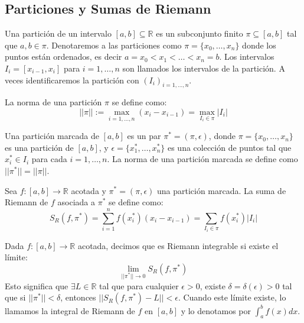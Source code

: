 \documentclass[11pt]{article}
\begin{document}
\subsection{Particiones y Sumas de Riemann}

\begin{definition}
Una partición de un intervalo $[a,b] \subseteq \mathbb{R}$ es un subconjunto finito $\pi \subseteq [a,b]$ tal que $a,b \in \pi$. Denotaremos a las particiones como $\pi = \{x_0, \dots, x_n\}$ donde los puntos están ordenados, es decir $a=x_0 < x_1 < \dots < x_n = b$. Los intervalos $I_i = [x_{i-1}, x_i]$ para $i=1,\dots,n$ son llamados los intervalos de la partición. A veces identificaremos la partición con $(I_i)_{i=1,\dots,n}.$
\end{definition}

\begin{definition}
La norma de una partición $\pi$ se define como:
$$ ||\pi|| := \max_{i=1,\dots,n}(x_i - x_{i-1}) = \max_{I_i \in \pi} |I_i| $$
\end{definition}

\begin{definition}
Una partición marcada de $[a,b]$ es un par $\pi^* = (\pi, \epsilon)$, donde $\pi = \{x_0, \dots, x_n\}$ es una partición de $[a,b]$, y $\epsilon = \{x_1^*, \dots, x_n^*\}$ es una colección de puntos tal que $x_i^* \in I_i$ para cada $i=1,\dots,n$. La norma de una partición marcada se define como $||\pi^*|| = ||\pi||$.
\end{definition}

\begin{definition}
Sea $f:[a,b] \rightarrow \mathbb{R}$ acotada y $\pi^* = (\pi, \epsilon)$ una partición marcada. La suma de Riemann de $f$ asociada a $\pi^*$ se define como:
$$ S_R(f, \pi^*) = \sum_{i=1}^{n} f(x_i^*)(x_i - x_{i-1}) = \sum_{I_i \in \pi} f(x_i^*) |I_i| $$
\end{definition}

\begin{definition}
Dada $f:[a,b] \rightarrow \mathbb{R}$ acotada, decimos que es Riemann integrable si existe el límite:
$$ \lim_{||\pi^*|| \rightarrow 0} S_R(f, \pi^*) $$
Esto significa que $\exists L \in \mathbb{R}$ tal que para cualquier $\epsilon > 0$, existe $\delta = \delta(\epsilon) > 0$ tal que si $||\pi^*|| < \delta$, entonces $||S_R(f, \pi^*) - L|| < \epsilon$. Cuando este límite existe, lo llamamos la integral de Riemann de $f$ en $[a,b]$ y lo denotamos por $\int_{a}^{b} f(x)dx$.
\end{definition}
\end{document}
